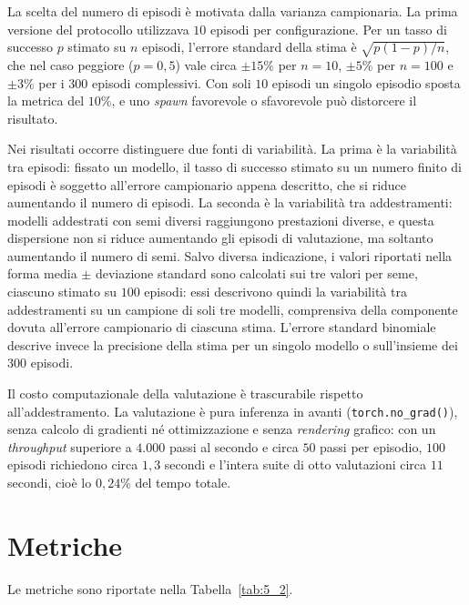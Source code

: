\documentclass[12pt,a4paper,twoside]{report}
\begin{document}
La scelta del numero di episodi è motivata dalla varianza campionaria. La prima versione del protocollo utilizzava $10$ episodi per configurazione. Per un tasso di successo $p$ stimato su $n$ episodi, l'errore standard della stima è $\sqrt{p(1 - p)/n}$, che nel caso peggiore ($p = 0,5$) vale circa $\pm 15\%$ per $n = 10$, $\pm 5\%$ per $n = 100$ e $\pm 3\%$ per i $300$ episodi complessivi. Con soli $10$ episodi un singolo episodio sposta la metrica del $10\%$, e uno \emph{spawn} favorevole o sfavorevole può distorcere il risultato.

Nei risultati occorre distinguere due fonti di variabilità. La prima è la variabilità tra episodi: fissato un modello, il tasso di successo stimato su un numero finito di episodi è soggetto all'errore campionario appena descritto, che si riduce aumentando il numero di episodi. La seconda è la variabilità tra addestramenti: modelli addestrati con semi diversi raggiungono prestazioni diverse, e questa dispersione non si riduce aumentando gli episodi di valutazione, ma soltanto aumentando il numero di semi. 
\newpage
Salvo diversa indicazione, i valori riportati nella forma media $\pm$ deviazione standard sono calcolati sui tre valori per seme, ciascuno stimato su $100$ episodi: essi descrivono quindi la variabilità tra addestramenti su un campione di soli tre modelli, comprensiva della componente dovuta all'errore campionario di ciascuna stima. L'errore standard binomiale descrive invece la precisione della stima per un singolo modello o sull'insieme dei $300$ episodi.

Il costo computazionale della valutazione è trascurabile rispetto all'addestramento. La valutazione è pura inferenza in avanti (\texttt{torch.no\_grad()}), senza calcolo di gradienti né ottimizzazione e senza \emph{rendering} grafico: con un \emph{throughput} superiore a $4.000$ passi al secondo e circa $50$ passi per episodio, $100$ episodi richiedono circa $1,3$ secondi e l'intera suite di otto valutazioni circa $11$ secondi, cioè lo $0,24\%$ del tempo totale.

\section{Metriche}
\label{sec:metriche}

Le metriche sono riportate nella Tabella~\ref{tab:5_2}.
\end{document}
